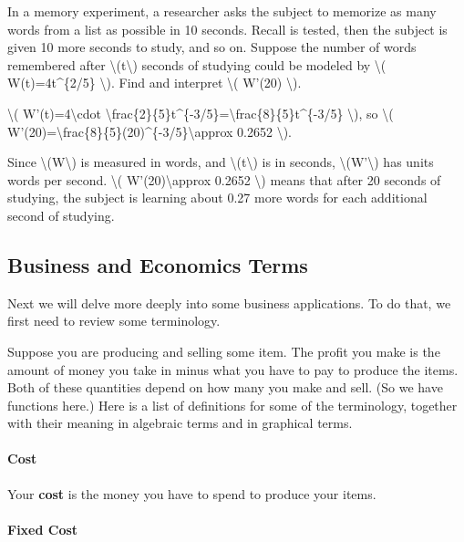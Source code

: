 In a memory experiment, a researcher asks the subject to memorize as
many words from a list as possible in 10 seconds. Recall is tested, then
the subject is given 10 more seconds to study, and so on. Suppose the
number of words remembered after \textbackslash{}(t\textbackslash{})
seconds of studying could be modeled by \textbackslash{}(
W(t)=4t\^{}\{2/5\} \textbackslash{}). Find and interpret
\textbackslash{}( W'(20) \textbackslash{}).

\textbackslash{}( W'(t)=4\textbackslash{}cdot
\textbackslash{}frac\{2\}\{5\}t\^{}\{-3/5\}=\textbackslash{}frac\{8\}\{5\}t\^{}\{-3/5\}
\textbackslash{}), so \textbackslash{}(
W'(20)=\textbackslash{}frac\{8\}\{5\}(20)\^{}\{-3/5\}\textbackslash{}approx
0.2652 \textbackslash{}).

Since \textbackslash{}(W\textbackslash{}) is measured in words, and
\textbackslash{}(t\textbackslash{}) is in seconds,
\textbackslash{}(W'\textbackslash{}) has units words per second.
\textbackslash{}( W'(20)\textbackslash{}approx 0.2652 \textbackslash{})
means that after 20 seconds of studying, the subject is learning about
0.27 more words for each additional second of studying.

\hypertarget{business-and-economics-terms}{%
\subsection{Business and Economics
Terms}\label{business-and-economics-terms}}

Next we will delve more deeply into some business applications. To do
that, we first need to review some terminology.

Suppose you are producing and selling some item. The profit you make is
the amount of money you take in minus what you have to pay to produce
the items. Both of these quantities depend on how many you make and
sell. (So we have functions here.) Here is a list of definitions for
some of the terminology, together with their meaning in algebraic terms
and in graphical terms.

\hypertarget{cost}{%
\paragraph{Cost}\label{cost}}

Your \textbf{cost} is the money you have to spend to produce your items.

\hypertarget{fixed-cost}{%
\paragraph{Fixed Cost}\label{fixed-cost}}

